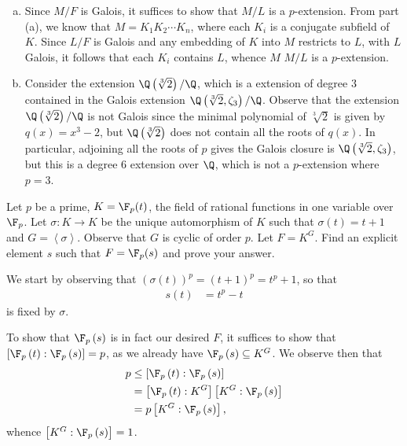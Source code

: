 \documentclass[10pt]{mypackage}
\begin{document}
\begin{solution}
\begin{enumerate}[(a)]
      If $K/F$ and $L/F$ are $p$-extensions, then we know that $KL/F$ is Galois, so we have
      \begin{align*}
        \left[ KL:F \right] &= \left[ KL:K \right] \left[ K:F \right]\\
                            &= \left[ L:K\cap L \right] \left[ K:F \right],
      \end{align*}
      but since $K\cap L$ corresponds to a subgroup of $\gal\left( L/F \right)$, it follows that $\left[ KL:F \right]$ is a $p$-extension.
    \item Since $M/F$ is Galois, it suffices to show that $M/L$ is a $p$-extension. From part (a), we know that $M = K_1K_2\cdots K_n$, where each $K_i$ is a conjugate subfield of $K$. Since $L/F$ is Galois and any embedding of $K$ into $M$ restricts to $L$, with $L$ Galois, it follows that each $K_i$ contains $L$, whence $M$ $M/L$ is a $p$-extension.
    \item Consider the extension $\Q\left( \sqrt[3]{2} \right)/\Q$, which is a extension of degree $3$ contained in the Galois extension $\Q\left( \sqrt[3]{2},\zeta_3 \right)/\Q$. Observe that the extension $\Q\left( \sqrt[3]{2} \right)/\Q$ is not Galois since the minimal polynomial of $\sqrt[3]{2}$ is given by $q(x) = x^3-2$, but $\Q\left( \sqrt[3]{2} \right)$ does not contain all the roots of $q(x)$. In particular, adjoining all the roots of $p$ gives the Galois closure is $\Q\left( \sqrt[3]{2},\zeta_3 \right)$, but this is a degree $6$ extension over $\Q$, which is not a $p$-extension where $p = 3$.
  \end{enumerate}
\end{solution}
\begin{problem}[Problem 6]
  Let $p$ be a prime, $K = \F_p(t)$, the field of rational functions in one variable over $\F_p$. Let $\sigma\colon K\rightarrow K$ be the unique automorphism of $K$ such that $\sigma(t) = t + 1$ and $G = \left\langle \sigma \right\rangle$. Observe that $G$ is cyclic of order $p$. Let $F = K^{G}$. Find an explicit element $s$ such that $F = \F_p(s)$ and prove your answer.
\end{problem}
\begin{solution}
  We start by observing that $\left( \sigma(t) \right)^{p} = \left( t+1 \right)^{p} = t^{p} + 1$, so that
  \begin{align*}
    s(t) &= t^{p} - t
  \end{align*}
  is fixed by $\sigma$.

  To show that $\F_p\left( s \right)$ is in fact our desired $F$, it suffices to show that $\left[ \F_p\left( t \right):\F_p\left( s \right) \right] = p$, as we already have $\F_p\left( s \right)\subseteq K^{G}$. We observe then that
  \begin{align*}
    p&\leq \left[ \F_p\left( t \right):\F_p\left( s \right) \right]\\
     &= \left[ \F_p\left( t \right):K^{G} \right]\left[ K^{G}: \F_p\left( s \right)\right]\\
     &= p\left[ K^{G}:\F_p\left( s \right) \right],
  \end{align*}
  whence $\left[ K^{G}:\F_p\left( s \right) \right] = 1$.
\end{solution}
\end{document}
